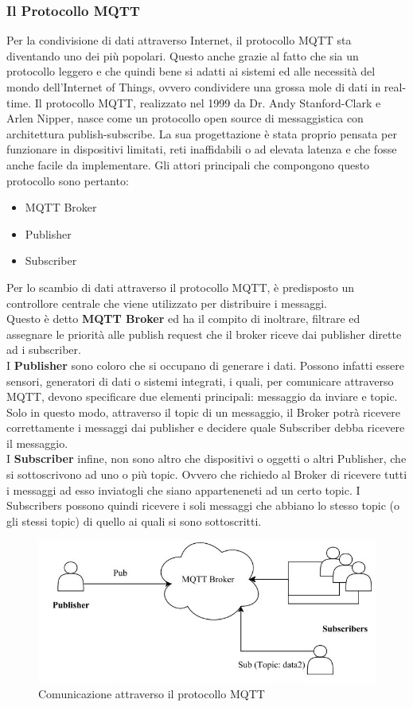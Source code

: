 \subsubsection{Il Protocollo MQTT}
\label{sec:MQTT_protocol}
Per la condivisione di dati attraverso Internet, il protocollo MQTT sta diventando uno dei più popolari. Questo anche grazie al fatto che sia un protocollo leggero e che quindi bene si adatti ai sistemi ed alle necessità del mondo dell'Internet of Things, ovvero condividere una grossa mole di dati in real-time.
Il protocollo MQTT, realizzato nel 1999 da Dr. Andy Stanford-Clark e Arlen Nipper, nasce come un protocollo open source di messaggistica con architettura publish-subscribe. La sua progettazione è stata proprio pensata per funzionare in dispositivi limitati, reti inaffidabili o ad elevata latenza e che fosse anche facile da implementare. \cite{famous:paper_mqtt_intro} \cite{book:slide_Grieco}
Gli attori principali che compongono questo protocollo sono pertanto:
\begin{itemize}
	\item MQTT Broker
	\item Publisher
	\item Subscriber
\end{itemize}
Per lo scambio di dati attraverso il protocollo MQTT, è predisposto un controllore centrale che viene utilizzato per distribuire i messaggi.\\ Questo è detto \textbf{MQTT Broker} ed ha il compito di inoltrare, filtrare ed assegnare le priorità alle publish request che il broker riceve dai publisher dirette ad i subscriber. \\
I \textbf{Publisher} sono coloro che si occupano di generare i dati. Possono infatti essere sensori, generatori di dati o sistemi integrati, i quali, per comunicare attraverso MQTT, devono specificare due elementi principali: messaggio da inviare e topic. Solo in questo modo, attraverso il topic di un messaggio, il Broker potrà ricevere correttamente i messaggi dai publisher e decidere quale Subscriber debba ricevere il messaggio. \\
I \textbf{Subscriber} infine, non sono altro che dispositivi o oggetti o altri Publisher, che si sottoscrivono ad uno o più topic. Ovvero che richiedo al Broker di ricevere tutti i messaggi ad esso inviatogli che siano apparteneneti ad un certo topic.
I Subscribers possono quindi ricevere i soli messaggi che abbiano lo stesso topic (o gli stessi topic) di quello ai quali si sono sottoscritti.
\begin{figure}
	\begin{center}
		\includegraphics[width=0.6\columnwidth]{images/mqtt_schema.jpg}
	\end{center}
	\caption{Comunicazione attraverso il protocollo MQTT \cite{famous:paper_mqtt_intro}}
	\label{fig:mqtt_schema}
\end{figure}
